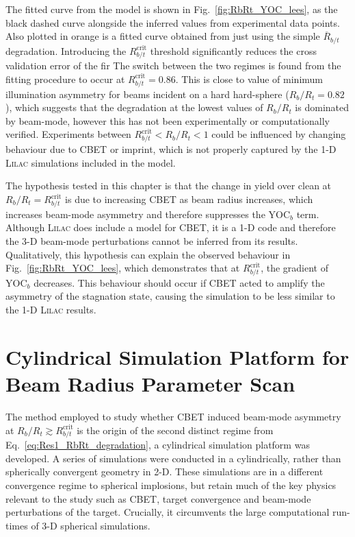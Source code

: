 The fitted curve from the model is shown in Fig.~\ref{fig:RbRt_YOC_lees}, as the black dashed curve alongside the inferred values from experimental data points.
Also plotted in orange is a fitted curve obtained from just using the simple $\overline{R}_{b/t}$ degradation.
Introducing the $R_{b/t}^{\text{crit}}$ threshold significantly reduces the cross validation error of the fir 
The switch between the two regimes is found from the fitting procedure to occur at $R_{b/t}^{\text{crit}}=0.86$.
This is close to value of minimum illumination asymmetry for beams incident on a hard hard-sphere ($R_b/R_t=0.82$), which suggests that the degradation at the lowest values of $R_b/R_t$ is dominated by beam-mode, however this has not been experimentally or computationally verified.
Experiments between $R_{b/t}^{\text{crit}} < R_b/R_t < 1$ could be influenced by changing behaviour due to \ac{CBET} or imprint, which is not properly captured by the 1-D \textsc{Lilac} simulations included in the model.

The hypothesis tested in this chapter is that the change in yield over clean at $R_b/R_t = R_{b/t}^{\text{crit}}$ is due to increasing \ac{CBET} as beam radius increases, which increases beam-mode asymmetry and therefore suppresses the $\text{YOC}_{b}$ term.
Although \textsc{Lilac} does include a model for \ac{CBET}, it is a 1-D code and therefore the 3-D beam-mode perturbations cannot be inferred from its results.
Qualitatively, this hypothesis can explain the observed behaviour in Fig.~\ref{fig:RbRt_YOC_lees}, which demonstrates that at $R_{b/t}^{\text{crit}}$, the gradient of $\text{YOC}_{b}$ decreases.
This behaviour should occur if \ac{CBET} acted to amplify the asymmetry of the stagnation state, causing the simulation to be less similar to the 1-D \textsc{Lilac} results.

\section{Cylindrical Simulation Platform for Beam Radius Parameter Scan}%
\label{sec:Res1_CylRbRt_platform}

The method employed to study whether \ac{CBET} induced beam-mode asymmetry at $R_b/R_t\gtrsim R_{b/t}^{\text{crit}}$ is the origin of the second distinct regime from Eq.~\ref{eq:Res1_RbRt_degradation}, a cylindrical simulation platform was developed.
A series of simulations were conducted in a cylindrically, rather than spherically convergent geometry in 2-D.
These simulations are in a different convergence regime to spherical implosions, but retain much of the key physics relevant to the study such as \ac{CBET}, target convergence and beam-mode perturbations of the target.
Crucially, it circumvents the large computational run-times of 3-D spherical simulations.


